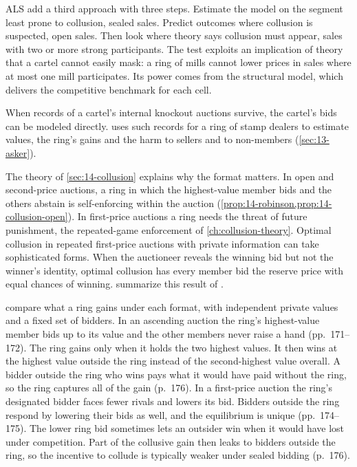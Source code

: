 ALS add a third approach with three steps. Estimate the model on the segment least prone to collusion,
sealed sales. Predict outcomes where collusion is suspected, open sales. Then look where theory says
collusion must appear, sales with two or more strong participants. The test exploits an implication of
theory that a cartel cannot easily mask: a ring of mills cannot lower prices in sales where at most one mill
participates. Its power comes from the structural model, which delivers the competitive benchmark for each
cell.

When records of a cartel's internal knockout auctions survive, the cartel's bids can be modeled directly.
\citet{Asker2010} uses such records for a ring of stamp dealers to estimate values, the ring's gains and the
harm to sellers and to non-members (\cref{sec:13-asker}).

The theory of \cref{sec:14-collusion} explains why the format matters. In open and second-price auctions,
a ring in which the highest-value member bids and the others abstain is self-enforcing within the auction
(\cref{prop:14-robinson,prop:14-collusion-open}). In first-price auctions a ring needs the threat of future
punishment, the repeated-game enforcement of \cref{ch:collusion-theory}. Optimal collusion in repeated
first-price auctions with private information can take sophisticated forms. When the auctioneer reveals the
winning bid but not the winner's identity, optimal collusion has every member bid the reserve price with
equal chances of winning.  summarize this result of
\citet{AtheyBagwellSanchirico2004}.

\citet[ch.~8]{MarshallMarx2012} compare what a ring gains under each format, with independent private
values and a fixed set of bidders. In an ascending auction the ring's highest-value member bids up to its
value and the other members never raise a hand (pp.~171--172). The ring gains only when it holds the two
highest values. It then wins at the highest value outside the ring instead of the second-highest value
overall. A bidder outside the ring who wins pays what it would have paid without the ring, so the ring
captures all of the gain (p.~176). In a first-price auction the ring's designated bidder faces fewer rivals
and lowers its bid. Bidders outside the ring respond by lowering their bids as well, and the equilibrium
is unique (pp.~174--175). The lower ring bid sometimes lets an outsider win when it would have lost under
competition. Part of the collusive gain then leaks to bidders outside the ring, so the incentive to collude
is typically weaker under sealed bidding (p.~176).

